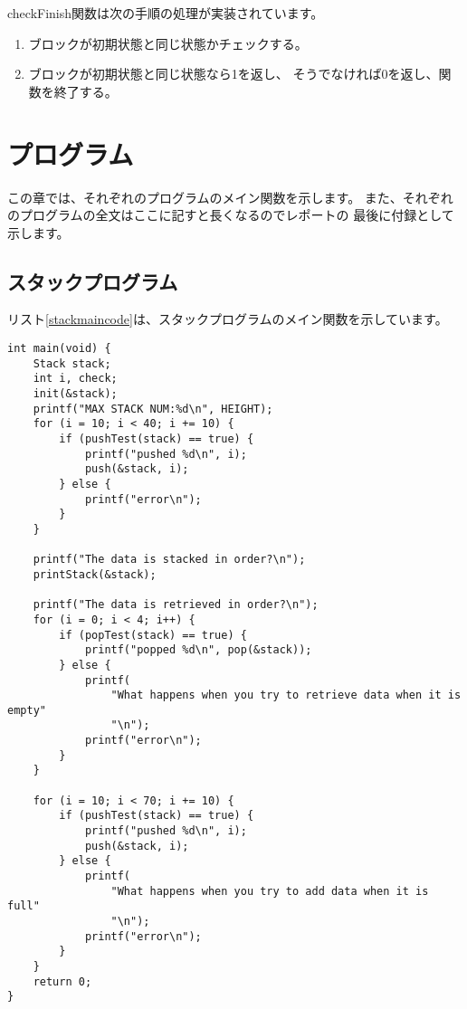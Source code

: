 \documentclass[a4j]{jarticle}
\begin{document}
checkFinish関数は次の手順の処理が実装されています。
\begin{enumerate}
  \item ブロックが初期状態と同じ状態かチェックする。
  \item ブロックが初期状態と同じ状態なら1を返し、
        そうでなければ0を返し、関数を終了する。
\end{enumerate}

\section{プログラム}
この章では、それぞれのプログラムのメイン関数を示します。
また、それぞれのプログラムの全文はここに記すと長くなるのでレポートの
最後に付録として示します。
\subsection{スタックプログラム}
リスト\ref{stackmaincode}は、スタックプログラムのメイン関数を示しています。
\begin{lstlisting}[caption=スタックのメイン関数,label=stackmaincode]
  int main(void) {
    Stack stack;
    int i, check;
    init(&stack);
    printf("MAX STACK NUM:%d\n", HEIGHT);
    for (i = 10; i < 40; i += 10) {
        if (pushTest(stack) == true) {
            printf("pushed %d\n", i);
            push(&stack, i);
        } else {
            printf("error\n");
        }
    }

    printf("The data is stacked in order?\n");
    printStack(&stack);

    printf("The data is retrieved in order?\n");
    for (i = 0; i < 4; i++) {
        if (popTest(stack) == true) {
            printf("popped %d\n", pop(&stack));
        } else {
            printf(
                "What happens when you try to retrieve data when it is empty"
                "\n");
            printf("error\n");
        }
    }

    for (i = 10; i < 70; i += 10) {
        if (pushTest(stack) == true) {
            printf("pushed %d\n", i);
            push(&stack, i);
        } else {
            printf(
                "What happens when you try to add data when it is full"
                "\n");
            printf("error\n");
        }
    }
    return 0;
}
\end{lstlisting}
\end{document}
